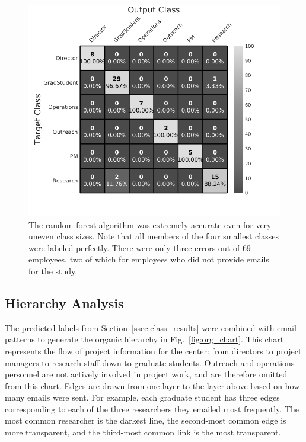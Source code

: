 \documentclass[10pt,twocolumn,conference]{IEEEtran}
\begin{document}
\begin{figure}[t]
    \centering
    \includegraphics[width=0.85\columnwidth,trim={1mm 8mm 10mm 0mm},clip]{Classification_confusion_BW}
    \vspace{-15pt}
    \caption{The random forest algorithm was extremely accurate even for very uneven class sizes.  Note that all members of the four smallest classes were labeled perfectly.  There were only three errors out of $69$ employees, two of which for employees who did not provide emails for the study.}
    \vspace{-16pt}
    \label{fig:result_hist}
\end{figure}


\subsection{Hierarchy Analysis}
The predicted labels from Section~\ref{ssec:class_results} were combined with email patterns to generate the organic hierarchy in Fig.~\ref{fig:org_chart}.
This chart represents the flow of project information for the center: from directors to project managers to research staff down to graduate students.
Outreach and operations personnel are not actively involved in project work, and are therefore omitted from this chart.
Edges are drawn from one layer to the layer above based on how many emails were sent.
For example, each graduate student has three edges corresponding to each of the three researchers they emailed most frequently.
The most common researcher is the darkest line, the second-most common edge is more transparent, and the third-most common link is the most transparent.
\end{document}
